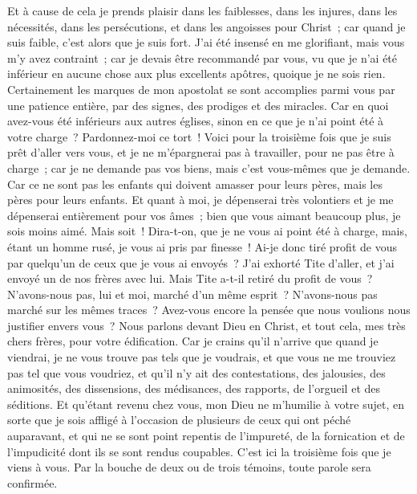 \begin{multicols}{2}
Et à cause de cela je prends plaisir dans les faiblesses, dans les injures, dans les nécessités, dans les persécutions, et dans les angoisses pour Christ~; car quand je suis faible, c'est alors que je suis fort.
J'ai été insensé en me glorifiant, mais vous m'y avez contraint~; car je devais être recommandé par vous, vu que je n'ai été inférieur en aucune chose aux plus excellents apôtres, quoique je ne sois rien.
Certainement les marques de mon apostolat se sont accomplies parmi vous par une patience entière, par des signes, des prodiges et des miracles.
Car en quoi avez-vous été inférieurs aux autres églises, sinon en ce que je n'ai point été à votre charge~? Pardonnez-moi ce tort~!
Voici pour la troisième fois que je suis prêt d'aller vers vous, et je ne m'épargnerai pas à travailler, pour ne pas être à charge~; car je ne demande pas vos biens, mais c'est vous-mêmes que je demande. Car ce ne sont pas les enfants qui doivent amasser pour leurs pères, mais les pères pour leurs enfants.
Et quant à moi, je dépenserai très volontiers et je me dépenserai entièrement pour vos âmes~; bien que vous aimant beaucoup plus, je sois moins aimé. 
Mais soit~! Dira-t-on, que je ne vous ai point été à charge, mais, étant un homme rusé, je vous ai pris par finesse~!
Ai-je donc tiré profit de vous par quelqu'un de ceux que je vous ai envoyés~?
J'ai exhorté Tite d'aller, et j'ai envoyé un de nos frères avec lui. Mais Tite a-t-il retiré du profit de vous~? N'avons-nous pas, lui et moi, marché d'un même esprit~? N'avons-nous pas marché sur les mêmes traces~?
Avez-vous encore la pensée que nous voulions nous justifier envers vous~? Nous parlons devant Dieu en Christ, et tout cela, mes très chers frères, pour votre édification.
Car je crains qu'il n'arrive que quand je viendrai, je ne vous trouve pas tels que je voudrais, et que vous ne me trouviez pas tel que vous voudriez, et qu'il n'y ait des contestations, des jalousies, des animosités, des dissensions, des médisances, des rapports, de l'orgueil et des séditions.
Et qu'étant revenu chez vous, mon Dieu ne m'humilie à votre sujet, en sorte que je sois affligé à l'occasion de plusieurs de ceux qui ont péché auparavant, et qui ne se sont point repentis de l'impureté, de la fornication et de l'impudicité dont ils se sont rendus coupables.
\VerseOne{}C'est ici la troisième fois que je viens à vous. Par la bouche de deux ou de trois témoins, toute parole sera confirmée.

\end{multicols}
